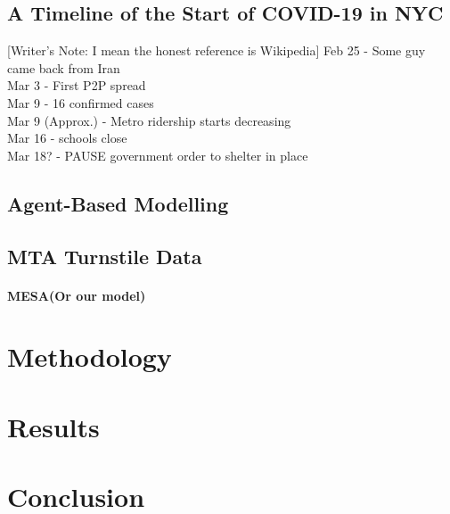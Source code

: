 \documentclass[12pt, a4, epsf] {article}
\theoremstyle{plain}
\theoremstyle{definition}
\begin{document}
\subsection*{A Timeline of the Start of COVID-19 in NYC}
[Writer's Note: I mean the honest reference is Wikipedia]
Feb 25 - Some guy came back from Iran\\
Mar 3 - First P2P spread\\
Mar 9 - 16 confirmed cases\\
Mar 9 (Approx.) - Metro ridership starts decreasing\\
Mar 16 - schools close\\
Mar 18? - PAUSE government order to shelter in place\\
\subsection*{Agent-Based Modelling}
\subsection*{MTA Turnstile Data}
\paragraph*{MESA(Or our model)}
\section*{Methodology}
\section*{Results}
\section*{Conclusion}
\nocite{*}
{}

\end{document}
